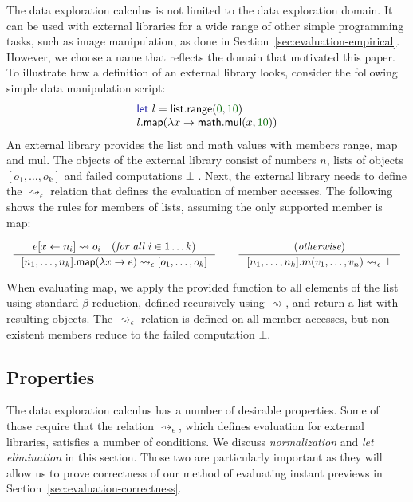 \documentclass[english,crc]{programming}
\theoremstyle{plain}
\theoremstyle{definition}
\newcommand{\num}[1]{\textcolor{numclr}{#1}}
\newcommand{\ident}[1]{\textnormal{\textcolor{idclr}{\sffamily #1}}}
\newcommand{\kvd}[1]{\textnormal{\textcolor{kvdclr}{\sffamily #1}}}
\begin{document}
The data exploration calculus is not limited to the data exploration domain.
It can be used with external libraries for a wide range of other simple programming tasks, such as image
manipulation, as done in Section~\ref{sec:evaluation-empirical}. However, we choose a name that reflects the
domain that motivated this paper. To illustrate how a definition of an external library looks,
consider the following simple data manipulation script:
%
\begin{equation*}
\begin{array}{l}
\kvd{let}~l = \ident{list}.\ident{range}(\num{0}, \num{10})\\
l.\ident{map}(\lambda x \rightarrow \ident{math}.\ident{mul}(x, \num{10}))
\end{array}
\end{equation*}
%
An external library provides the \ident{list} and \ident{math} values with members
\ident{range}, \ident{map} and \ident{mul}. The objects of the external library consist of
numbers $n$, lists of objects $[o_1, \ldots, o_k]$ and failed computations $\bot$ \cite{gowrong}.
Next, the external library needs to define the $\rightsquigarrow_\epsilon$ relation that defines
the evaluation of member accesses. The following shows the rules for members of lists, assuming
the only supported member is \ident{map}:
%
\begin{equation*}
\begin{array}{l}
\\[-0.75em]
\inference
  {e[x \leftarrow n_i] \rightsquigarrow o_i \quad (\textit{for all $i\in 1\ldots k$})}
  {[ n_1, \ldots, n_k ].\ident{map}(\lambda x\rightarrow e) \rightsquigarrow_\epsilon [ o_1, \ldots, o_k ]}
\qquad
\inference
  {(\textit{otherwise})}
  {[ n_1, \ldots, n_k ].m(v_1, \ldots, v_n) \rightsquigarrow_\epsilon \bot}
\\[-0.75em]
~
\end{array}
\end{equation*}
%
When evaluating \ident{map}, we apply the provided function to all elements of the list using
standard $\beta$-reduction, defined recursively using $\rightsquigarrow$, and return a list with
resulting objects. The $\rightsquigarrow_\epsilon$ relation is defined on all member accesses,
but non-existent members reduce to the failed computation $\bot$.

\subsection{Properties}
The data exploration calculus has a number of desirable properties. Some of those require that the
relation $\rightsquigarrow_\epsilon$, which defines evaluation for external libraries, satisfies a
number of conditions. We discuss \emph{normalization} and \emph{let elimination} in this section.
Those two are particularly important as they will allow us to prove correctness of our method of
evaluating instant previews in Section~\ref{sec:evaluation-correctness}.
\end{document}
